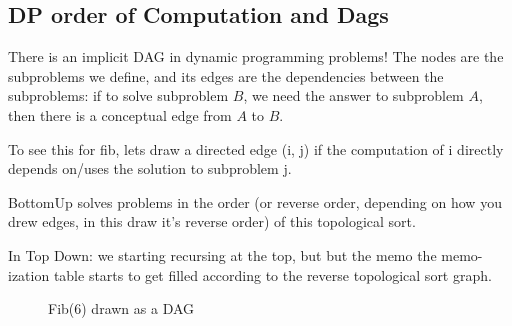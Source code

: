 \documentclass[12pt]{article}
\begin{document}
\subsection{DP order of Computation and Dags}
There is an implicit DAG in dynamic programming problems! The nodes are the subproblems we define, and its edges are the dependencies between the subproblems: if to solve subproblem $B$, we need the answer to subproblem $A$, then there is a conceptual edge from $A$ to $B$.

To see this for fib, lets draw a directed edge (i, j) if the computation of i directly depends on/uses the solution to subproblem j.

BottomUp solves problems in the order (or reverse order, depending on how you drew edges, in this draw it's reverse order) of this topological sort.

In Top Down: we starting recursing at the top, but but the memo the memo-ization table starts to get filled according to the reverse topological sort graph.

\begin{figure}[H]
    \begin{center}
        \caption{Fib(6) drawn as a DAG}
    \end{center}
\end{figure}
\end{document}
